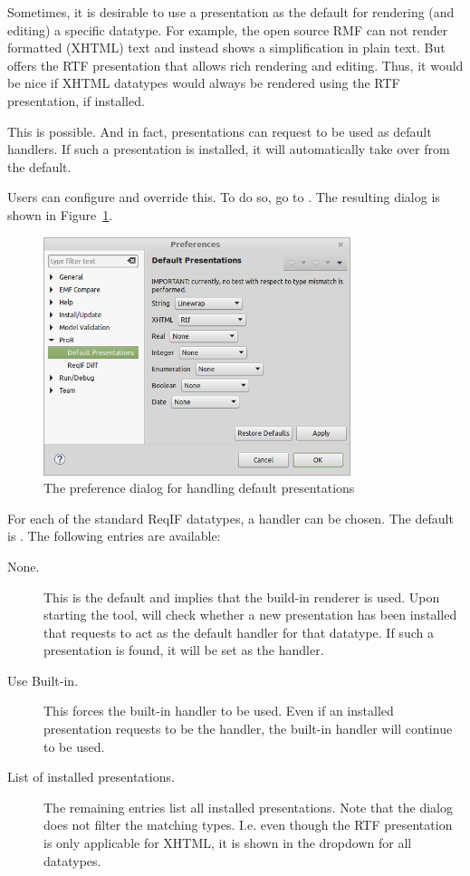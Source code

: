 Sometimes, it is desirable to use a presentation as the default for rendering (and editing) a specific datatype.  For example, the open source RMF can not render formatted (XHTML) text and instead shows a simplification in plain text.  But \pror{} offers the RTF presentation that allows rich rendering and editing.  Thus, it would be nice if XHTML datatypes would always be rendered using the RTF presentation, if installed.

This is possible.  And in fact, presentations can request to be used as default handlers.  If such a presentation is installed, it will automatically take over from the default.

Users can configure and override this.  To do so, go to .  The resulting dialog is shown in Figure~\ref{fig:default-handlers}.

\begin{figure}
  \centering
  \includegraphics[width=0.8\textwidth]{../rmf-images/default-handlers.png}
  \caption{The preference dialog for handling default presentations}
  \label{fig:default-handlers}
\end{figure}

For each of the standard ReqIF datatypes, a handler can be chosen.  The default is .  The following entries are available:

\begin{description}
\item[None.] This is the default and implies that the build-in renderer is used.   Upon starting the tool, \pror{} will check whether a new presentation has been installed that requests to act as the default handler for that datatype.  If such a presentation is found, it will be set as the handler.
\item[Use Built-in.] This forces the built-in handler to be used.  Even if an installed presentation requests to be the handler, the built-in handler will continue to be used.
\item[List of installed presentations.] The remaining entries list all installed presentations.  Note that the dialog does not filter the matching types.  I.e. even though the RTF presentation is only applicable for XHTML, it is shown in the dropdown for all datatypes.
\end{description}

